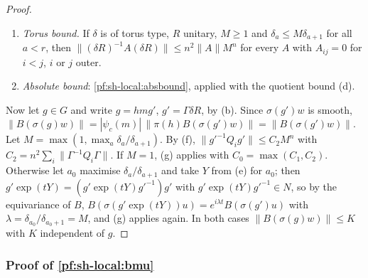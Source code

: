 \begin{proof}
\begin{enumerate}[label=(\alph*)]
$g'=\Gamma\delta R\in G$ there is $Y\in\mathfrak g$ with $\|Y\|\le C_1$, $g'\exp(tY)g'^{-1}\in N$ and
$\psi_c(g'\exp(tY)g'^{-1})=\exp(i\,t\,\delta_a/\delta_{a+1})$ for all $t$.
\item \emph{Torus bound.} If $\delta$ is of torus type, $R$ unitary, $M\ge1$ and $\delta_a\le M\delta_{a+1}$ for
all $a<r$, then $\|(\delta R)^{-1}A(\delta R)\|\le n^2\|A\|M^n$ for every $A$ with $A_{ij}=0$ for $i<j$, $i$ or $j$
outer.
\item \emph{Absolute bound}: \cref{pf:sh-local:absbound}, applied with the quotient bound (d).
\end{enumerate}
Now let $g\in G$ and write $g=hm g'$, $g'=\Gamma\delta R$, by (b). Since $\sigma(g')w$ is smooth,
$\|B(\sigma(g)w)\|=|\psi_c(m)|\,\|\pi(h)B(\sigma(g')w)\|=\|B(\sigma(g')w)\|$. Let
$M=\max(1,\max_a\delta_a/\delta_{a+1})$. By (f), $\|g'^{-1}Q_ig'\|\le C_2M^n$ with
$C_2=n^2\sum_i\|\Gamma^{-1}Q_i\Gamma\|$. If $M=1$, (g) applies with $C_0=\max(C_1,C_2)$. Otherwise let $a_0$
maximise $\delta_a/\delta_{a+1}$ and take $Y$ from (e) for $a_0$; then
$g'\exp(tY)=(g'\exp(tY)g'^{-1})g'$ with $g'\exp(tY)g'^{-1}\in N$, so by the equivariance of $B$,
$B(\sigma(g'\exp(tY))u)=e^{i\lambda t}B(\sigma(g')u)$ with $\lambda=\delta_{a_0}/\delta_{a_0+1}=M$, and (g) applies
again. In both cases $\|B(\sigma(g)w)\|\le K$ with $K$ independent of $g$.
\end{proof}

\subsubsection{Proof of \texorpdfstring{\cref{pf:sh-local:bmu}}{the uniqueness theorem}}

